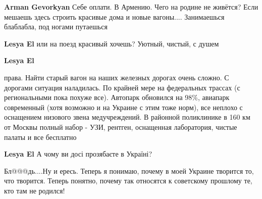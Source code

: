 \begin{itemize}
\begin{itemize}
 
\textbf{Arman Gevorkyan} Себе оплати. В Армению. Чего на родине не живётся? Если мешаешь здесь строить красивые дома и новые вагоны.... Занимаешься блаблабла, под ногами путаешься

 
\textbf{Lesya El} или на поезд красивый хочешь? Уютный, чистый, с душем

 
\textbf{Lesya El} 

права. Найти старый вагон на наших железных дорогах очень сложно. С дорогами
ситуация наладилась. По крайней мере на федеральных трассах (с региональными
пока похуже все). Автопарк обновился на 98\%, авиапарк современный (хотя
возможно и на Украине с этим тоже норм), все неплохо с оснащением низового
звена медучреждений. В районной поликлинике в 160 км от Москвы полный набор -
УЗИ, рентген, оснащенная лаборатория, чистые палаты и все бесплатно


 
\textbf{Lesya El} А чому ви досі прозябаєте в Україні?

\end{itemize}

 
Бл@@@дь....Ну и ересь. Теперь я понимаю, почему в моей Украине творится то, что
творится. Теперь понятно, почему так относятся к советскому прошлому те, кто
там не родился! 


\end{itemize}
